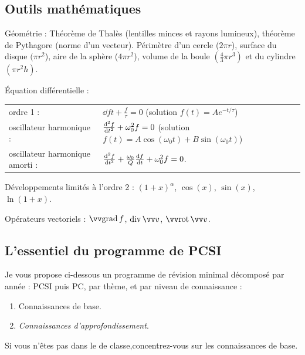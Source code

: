 \documentclass[12pt,fancy]{cours}
\begin{document}
\subsection{Outils mathématiques}
\begin{liste}
  \item Géométrie :  Théorème de Thalès (lentilles minces et rayons lumineux), théorème de Pythagore (norme d'un vecteur). Périmètre d'un cercle ($2\pi r$), surface du disque $(\pi r^2$), aire de la sphère ($4\pi r^2$), volume de la boule $(\frac{4}{3}\pi r^3)$ et du cylindre $(\pi r^2 h)$.
  \item Équation différentielle :

\begin{tabular}{ll}
 ordre 1 : & $\dd{f}{t} + \frac{f}{\tau} = 0$ (solution $f(t) = A e^{-t/\tau}$) \\
 oscillateur harmonique : & $\frac{\mathrm{d}^2{f}}{\mathrm{d}{t}^2} + \omega_0^2 f = 0$ (solution $f(t) = A \cos(\omega_0 t) +  B \sin(\omega_0 t)$) \\
 oscillateur harmonique amorti : & $\frac{\mathrm{d}^2{f}}{\mathrm{d}{t}^2} + \frac{\omega_0}{Q} \frac{\mathrm{d}{f}}{\mathrm{d}{t}}+ \omega_0^2 f = 0$.
\end{tabular}

  \item Développements limités à l'ordre 2 :  $(1+x)^\alpha$, $\cos(x)$, $\sin(x)$, $\ln(1+x)$.
  \item Opérateurs vectoriels : $\grad f$, $\dive \Vec{v}$, $\rot \Vec{v}$.
\end{liste}



\subsection{L'essentiel du programme de PCSI}
Je vous propose ci-dessous un programme de révision minimal décomposé par année : PCSI puis PC, par thème, et par niveau de connaissance :
\begin{enumerate}
  \item[\Note] Connaissances de base.
  \item[\Nnote] {\small\emph{Connaissances d'approfondissement}.}
\end{enumerate}
Si vous n'êtes pas dans le  de classe,concentrez-vous sur les connaissances de base.
\end{document}
